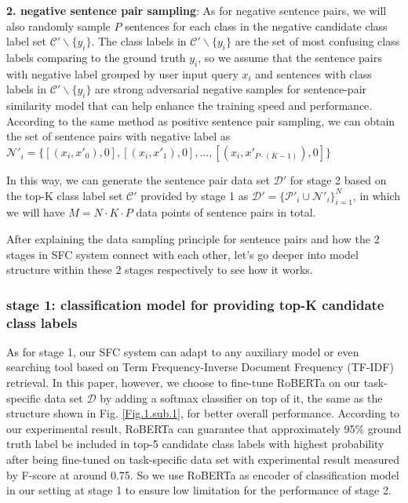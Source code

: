 \documentclass[letterpaper]{article} %
\begin{document}
  \textbf{2.  negative  sentence pair sampling}: As for negative sentence pairs,
  we  will  also  randomly  sample  $P$ sentences for each class in the negative
  candidate class label set $\mathcal{C'}\backslash \{y_{i}\}$. The class labels
  in  $\mathcal{C'}\backslash  \{y_{i}\}$  are  the  set of most confusing class
  labels comparing to the ground truth ${y_{i}}$, so we assume that the sentence
  pairs  with  negative  label grouped by user input query $x_{i}$ and sentences
  with class labels in $\mathcal{C'}\backslash \{y_{i}\}$ are strong adversarial
  negative  samples for sentence-pair similarity model that can help enhance the
  training  speed  and  performance.  According  to  the same method as positive
  sentence  pair sampling, we can obtain the set of sentence pairs with negative
  label  as $\mathcal{N'}_{i}=\{[(x_{i}, x'_{0}), 0], [(x_{i}, x'_{1}), 0], ...,
  [(x_{i}, x'_{P\cdot (K-1)}), 0]\}$

  In  this  way,  we  can generate the sentence pair data set $\mathcal{D'}$ for
  stage  2 based on the top-K class label set $\mathcal{C'}$ provided by stage 1
  as   $\mathcal{D'}=\{\mathcal{P'}_{i}\cup   \mathcal{N'}_{i}\}_{i=1}^{N}$,  in
  which we will have $M=N\cdot K\cdot P$ data points of sentence pairs in total.

  After  explaining the data sampling principle for sentence pairs and how the 2
  stages  in  SFC  system  connect  with  each other, let's go deeper into model
  structure within these 2 stages respectively to see how it works.

  \subsubsection*{
    stage 1: classification model for providing top-K candidate class labels
  }

  As for  stage  1,  our  SFC  system  can adapt to any auxiliary model or even
  searching  tool  based  on  Term Frequency-Inverse Document Frequency (TF-IDF)
  retrieval.  In  this  paper,  however,  we  choose to fine-tune RoBERTa on our
  task-specific  data set $\mathcal{D}$ by adding a softmax classifier on top of
  it,  the  same  as  the  structure shown in Fig. \ref{Fig.1.sub.1}, for better
  overall  performance.  According  to  our  experimental  result,  RoBERTa  can
  guarantee  that  approximately  95\%  ground  truth label be included in top-5
  candidate  class  labels  with  highest  probability after being fine-tuned on
  task-specific  data set with experimental result measured by F-score at around
  0.75.  So  we use RoBERTa as encoder of classification model in our setting at
  stage 1 to ensure low limitation for the performance of stage 2.
\end{document}

